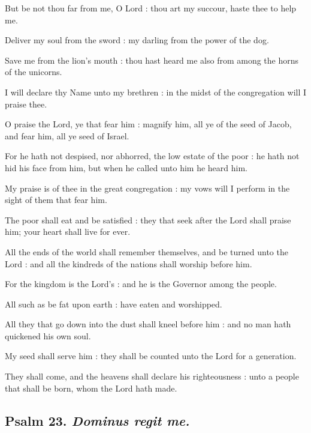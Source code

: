 But be not thou far from me, O Lord : thou art my succour, haste thee to help me.\par
{}Deliver my soul from the sword : my darling from the power of the dog.\par
{}Save me from the lion's mouth : thou hast heard me also from among the horns of the unicorns.\par
{}I will declare thy Name unto my brethren : in the midst of the congregation will I praise thee.\par
{}O praise the Lord, ye that fear him : magnify him, all ye of the seed of Jacob, and fear him, all ye seed of Israel.\par
{}For he hath not despised, nor abhorred, the low estate of the poor : he hath not hid his face from him, but when he called unto him he heard him.\par
{}My praise is of thee in the great congregation : my vows will I perform in the sight of them that fear him.\par
{}The poor shall eat and be satisfied : they that seek after the Lord shall praise him; your heart shall live for ever.\par
{}All the ends of the world shall remember themselves, and be turned unto the Lord : and all the kindreds of the nations shall worship before him.\par
{}For the kingdom is the Lord's : and he is the Governor among the people.\par
{}All such as be fat upon earth : have eaten and worshipped.\par
{}All they that go down into the dust shall kneel before him : and no man hath quickened his own soul.\par
{}My seed shall serve him : they shall be counted unto the Lord for a generation.\par
{}They shall come, and the heavens shall declare his righteousness : unto a people that shall be born, whom the Lord hath made.\par

\subsection{Psalm 23. \textit{Dominus regit me.}}

